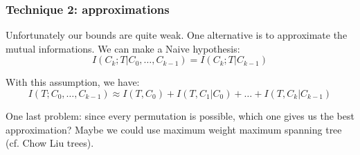 \subsubsection{Technique 2: approximations}

Unfortunately our bounds are quite weak. One alternative is to
approximate the mutual informations. We can make a Naive hypothesis:
\[
    I(C_k ; T | C_0, \ldots, C_{k-1}) = I(C_k ; T | C_{k-1})
\]

With this assumption, we have:
\[
    I(T ; C_0, \ldots, C_{k-1}) \approx I(T, C_0) + I(T, C_1 | C_0)+ \ldots +  I(T, C_k | C_{k-1})
\]

One last problem: since every permutation is possible, which one gives us the
best approximation?  Maybe we could use maximum weight
maximum spanning tree (cf. Chow Liu trees).
